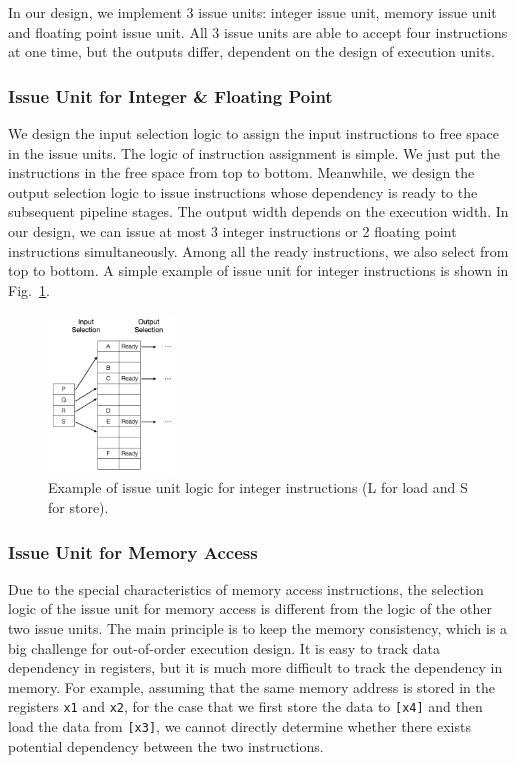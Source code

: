 In our design, we implement 3 issue units: integer issue unit, memory issue unit and floating point issue unit. All 3 issue units are able to accept four instructions at one time, but the outputs differ, dependent on the design of execution units.

\subsubsection{Issue Unit for Integer \& Floating Point} %
We design the input selection logic to assign the input instructions to free space in the issue units. The logic of instruction assignment is simple. We just put the instructions in the free space from top to bottom. Meanwhile, we design the output selection logic to issue instructions whose dependency is ready to the subsequent pipeline stages. The output width depends on the execution width. In our design, we can issue at most 3 integer instructions or 2 floating point instructions simultaneously. Among all the ready instructions, we also select from top to bottom. A simple example of issue unit for integer instructions is shown in Fig.~\ref{fig:iq-int}.

\begin{figure}[!htp]
    \centering
    \includegraphics[width=0.3\textwidth]{figure/iq1.png}
    \caption{Example of issue unit logic for integer instructions (L for load and S for store).}
    \label{fig:iq-int}
\end{figure}

\subsubsection{Issue Unit for Memory Access} %
Due to the special characteristics of memory access instructions, the selection logic of the issue unit for memory access is different from the logic of the other two issue units. The main principle is to keep the memory consistency, which is a big challenge for out-of-order execution design. It is easy to track data dependency in registers, but it is much more difficult to track the dependency in memory. For example, assuming that the same memory address is stored in the registers \texttt{x1} and \texttt{x2}, for the case that we first store the data to \texttt{[x4]} and then load the data from \texttt{[x3]}, we cannot directly determine whether there exists potential dependency between the two instructions. 

